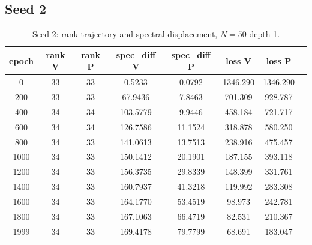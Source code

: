 \subsection*{Seed 2}
\begin{table}[H]
\centering
\caption{Seed 2: rank trajectory and spectral displacement, $N = 50$ depth-1.}
\label{tab:ranspec-s2}
\begin{tabular}{c c c c c c c c}
\toprule
epoch & rank V & rank P & spec\_diff V & spec\_diff P & loss V & loss P \\
\midrule
0 & 33 & 33 & 0.5233 & 0.0792 & 1346.290 & 1346.290 \\
200 & 33 & 33 & 67.9436 & 7.8463 & 701.309 & 928.787 \\
400 & 34 & 34 & 103.5779 & 9.9446 & 458.184 & 721.717 \\
600 & 34 & 34 & 126.7586 & 11.1524 & 318.878 & 580.250 \\
800 & 34 & 33 & 141.0613 & 13.7513 & 238.916 & 475.457 \\
1000 & 34 & 33 & 150.1412 & 20.1901 & 187.155 & 393.118 \\
1200 & 34 & 33 & 156.3735 & 29.8339 & 148.399 & 331.761 \\
1400 & 34 & 33 & 160.7937 & 41.3218 & 119.992 & 283.308 \\
1600 & 34 & 33 & 164.1770 & 53.4519 & 98.973 & 242.781 \\
1800 & 34 & 33 & 167.1063 & 66.4719 & 82.531 & 210.367 \\
1999 & 34 & 33 & 169.4178 & 79.7799 & 68.691 & 183.047 \\
\bottomrule
\end{tabular}
\end{table}

